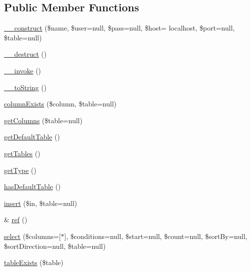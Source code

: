 \subsection*{Public Member Functions}
\begin{DoxyCompactItemize}
\item 
\hyperlink{class_my_s_q_l_database_a522739237db8d43369172cfe07bf7b85}{\+\_\+\+\_\+construct} (\$name, \$user=null, \$pass=null, \$host= \textquotesingle{}localhost\textquotesingle{}, \$port=null, \$table=null)
\item 
\hyperlink{class_my_s_q_l_database_a421831a265621325e1fdd19aace0c758}{\+\_\+\+\_\+destruct} ()
\item 
\hyperlink{class_my_s_q_l_database_a9aac7e1475efe923de4e19cc2511f092}{\+\_\+\+\_\+invoke} ()
\item 
\hyperlink{class_my_s_q_l_database_a7516ca30af0db3cdbf9a7739b48ce91d}{\+\_\+\+\_\+to\+String} ()
\item 
\hyperlink{class_my_s_q_l_database_a42c4cefdb183a7caa3115193a811d893}{column\+Exists} (\$column, \$table=null)
\item 
\hyperlink{class_my_s_q_l_database_a5cc0962e790b9ccffd2ca9c77cead320}{get\+Columns} (\$table=null)
\item 
\hyperlink{class_my_s_q_l_database_af54c3eed64c3e3dfb06a2541289ff0da}{get\+Default\+Table} ()
\item 
\hyperlink{class_my_s_q_l_database_a61b9097ace78236a1a7f9cfd9e9ab01c}{get\+Tables} ()
\item 
\hyperlink{class_my_s_q_l_database_a830b5c75df72b32396701bc563fbe3c7}{get\+Type} ()
\item 
\hyperlink{class_my_s_q_l_database_ad0aa1804fc79c22b46596db136320017}{has\+Default\+Table} ()
\item 
\hyperlink{class_my_s_q_l_database_a8e5626f114925dee9986c8edbfc3ec05}{insert} (\$in, \$table=null)
\item 
\& \hyperlink{class_my_s_q_l_database_ae6979f06c8e38dbe758ff53f7395531f}{ref} ()
\item 
\hyperlink{class_my_s_q_l_database_a1efc6b974510d4c668660f1abe184182}{select} (\$columns=\mbox{[}\textquotesingle{}$\ast$\textquotesingle{}\mbox{]}, \$conditions=null, \$start=null, \$count=null, \$sort\+By=null, \$sort\+Direction=null, \$table=null)
\item 
\hyperlink{class_my_s_q_l_database_ae7cdaa744d52a1eb0103e377023ca528}{table\+Exists} (\$table)
\end{DoxyCompactItemize}
